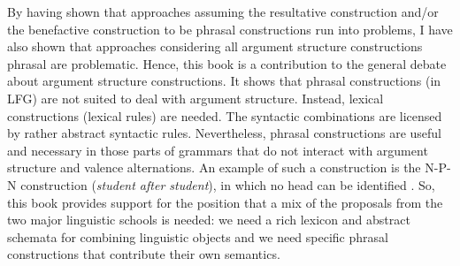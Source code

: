 By having shown that approaches assuming the resultative construction and/or the benefactive
construction to be phrasal constructions run into problems, I have also shown that approaches
considering all argument structure constructions phrasal are problematic. Hence, this book is a
contribution to the general debate about argument structure constructions. It shows that phrasal
constructions (in LFG) are not suited to deal with argument structure. Instead, lexical constructions
(lexical rules) are needed. The syntactic combinations are licensed by rather abstract syntactic
rules. Nevertheless, phrasal constructions are useful and necessary in those parts of grammars that
do not interact with argument structure and valence alternations. An example of such a construction
is the N-P-N construction (\emph{student after student}), in which no head can be identified
\citep{Jackendoff2008a}. So, this book provides support for the position that a mix of the proposals
from the two major linguistic schools is needed: we need a rich lexicon and abstract schemata for
combining linguistic objects and we need specific phrasal constructions that contribute their own semantics.





















